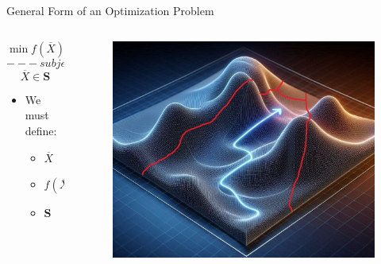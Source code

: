 \documentclass[10pt, aspectratio=169]{beamer}
\begin{document}
\begin{frame}{General Form of an Optimization Problem}
    \begin{columns}
        \begin{column}{0.5\textwidth}
            $$\min f(\overline{X})$$
            $$---\ subject\ to\ (s.t.)\ ---$$
            $$\overline{X} \in \textbf{S}$$
            \vspace{1cm}
            \begin{itemize}
                \item We must define:
                \begin{itemize}
                    \item $\overline{X}$
                    \item $f(\overline{X})$
                    \item $\textbf{S}$
                \end{itemize}
            \end{itemize}
        \end{column}
        \begin{column}{0.5\textwidth}
            \begin{figure}
                \includegraphics[width=\linewidth]{MountainWithFences.jpg}
            \end{figure}
        \end{column}
    \end{columns}
\end{frame}
\end{document}
